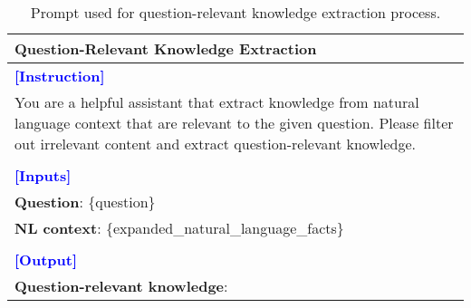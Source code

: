 \begin{table*}[htbp]
\centering
\begin{tabularx}{\textwidth}{X}

\toprule
\textbf{Question-Relevant Knowledge Extraction} \\ \midrule
\textcolor{blue}{\textbf{[Instruction]}} \\
You are a helpful assistant that extract knowledge from natural language context that are relevant to the given question. Please filter out irrelevant content and extract question-relevant knowledge. \\\\
\textcolor{blue}{\textbf{[Inputs]}} \\
\textbf{Question}: \{question\} \\
\textbf{NL context}: \{expanded\_natural\_language\_facts\} \\\\
\textcolor{blue}{\textbf{[Output]}} \\
\textbf{Question-relevant knowledge}: \\ \midrule
\end{tabularx}
\caption{Prompt used for question-relevant knowledge extraction process.}
\label{pmt:step3_2}
\end{table*}